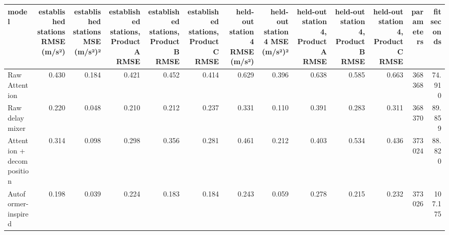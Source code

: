 \begin{tabular}{lrrrrrrrrrrrr}
\toprule
model & established stations RMSE (m/s²) & established stations MSE (m/s²)² & established stations, Product A RMSE & established stations, Product B RMSE & established stations, Product C RMSE & held-out station 4 RMSE (m/s²) & held-out station 4 MSE (m/s²)² & held-out station 4, Product A RMSE & held-out station 4, Product B RMSE & held-out station 4, Product C RMSE & parameters & fit seconds \\
\midrule
Raw Attention & 0.430 & 0.184 & 0.421 & 0.452 & 0.414 & 0.629 & 0.396 & 0.638 & 0.585 & 0.663 & 368368 & 74.910 \\
Raw delay mixer & 0.220 & 0.048 & 0.210 & 0.212 & 0.237 & 0.331 & 0.110 & 0.391 & 0.283 & 0.311 & 368370 & 89.859 \\
Attention + decomposition & 0.314 & 0.098 & 0.298 & 0.356 & 0.281 & 0.461 & 0.212 & 0.403 & 0.534 & 0.436 & 373024 & 88.820 \\
Autoformer-inspired & 0.198 & 0.039 & 0.224 & 0.183 & 0.184 & 0.243 & 0.059 & 0.278 & 0.215 & 0.232 & 373026 & 107.175 \\
\bottomrule
\end{tabular}
